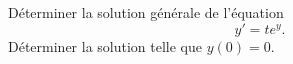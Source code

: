 \begin{exercice}\label{exo_II-1-01}

Déterminer la solution générale de l'équation
\begin{equation}
	y'=t e^{y}.
\end{equation}
Déterminer la solution telle que $y(0)=0$.

\end{exercice}


